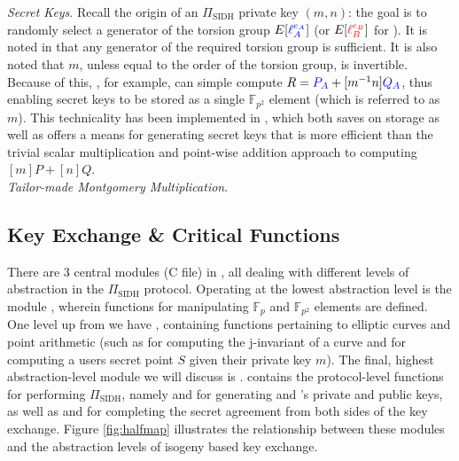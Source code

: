 \noindent
\emph{Secret Keys}. Recall the origin of an $\Pi_{\text{SIDH}}$ private key $(m, n)$: the goal is to randomly select a generator of the torsion group $E[\textcolor{blue}{\ell_{A}^{e_A}}]$ (or $E[\textcolor{red}{\ell_{B}^{e_B}}]$ for \bob). It is noted in \cite{djp} that any generator of the required torsion group is sufficient. It is also noted that $m$, unless equal to the order of the torsion group, is invertible. Because of this, \alice, for example, can simple compute $R = \textcolor{blue}{P_A} + [m^{-1}n]\textcolor{blue}{Q_A}$, thus enabling secret keys to be stored as a single $\mathbb{F}_{p^2}$ element (which is referred to as $m$). This technicality has been implemented in \sidh, which both saves on storage as well as offers a means for generating secret keys that is more efficient than the trivial scalar multiplication and point-wise addition approach to computing $[m]P + [n]Q$.\\

\noindent
\emph{Tailor-made Montgomery Multiplication}.

\subsection{Key Exchange \& Critical Functions}
\label{subsec:functions}

There are 3 central modules (C file) in \sidh, all dealing with different levels of abstraction in the $\Pi_{\text{SIDH}}$ protocol. Operating at the lowest abstraction level is the module , wherein functions for manipulating $\mathbb{F}_{p}$ and $\mathbb{F}_{p^2}$ elements are defined. One level up from  we have , containing functions pertaining to elliptic curves and point arithmetic (such as  for computing the j-invariant of a curve and  for computing a users secret point $S$ given their private key $m$). The final, highest abstraction-level module we will discuss is .  contains the protocol-level functions for performing $\Pi_{\text{SIDH}}$, namely  and  for generating \alice and \bob's private and public keys, as well as  and  for completing the secret agreement from both sides of the key exchange. Figure \ref{fig:halfmap} illustrates the relationship between these modules and the abstraction levels of isogeny based key exchange.

